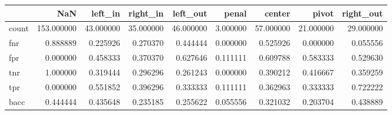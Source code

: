 \begin{tabular}{lrrrrrrrr}
\toprule
{} &         NaN &    left\_in &   right\_in &   left\_out &     penal &     center &      pivot &  right\_out \\
\midrule
count &  153.000000 &  43.000000 &  35.000000 &  46.000000 &  3.000000 &  57.000000 &  21.000000 &  29.000000 \\
fnr   &    0.888889 &   0.225926 &   0.270370 &   0.444444 &  0.000000 &   0.525926 &   0.000000 &   0.055556 \\
fpr   &    0.000000 &   0.458333 &   0.370370 &   0.627646 &  0.111111 &   0.609788 &   0.583333 &   0.529630 \\
tnr   &    1.000000 &   0.319444 &   0.296296 &   0.261243 &  0.000000 &   0.390212 &   0.416667 &   0.359259 \\
tpr   &    0.000000 &   0.551852 &   0.396296 &   0.333333 &  0.111111 &   0.362963 &   0.333333 &   0.722222 \\
bacc  &    0.444444 &   0.435648 &   0.235185 &   0.255622 &  0.055556 &   0.321032 &   0.203704 &   0.438889 \\
\bottomrule
\end{tabular}
